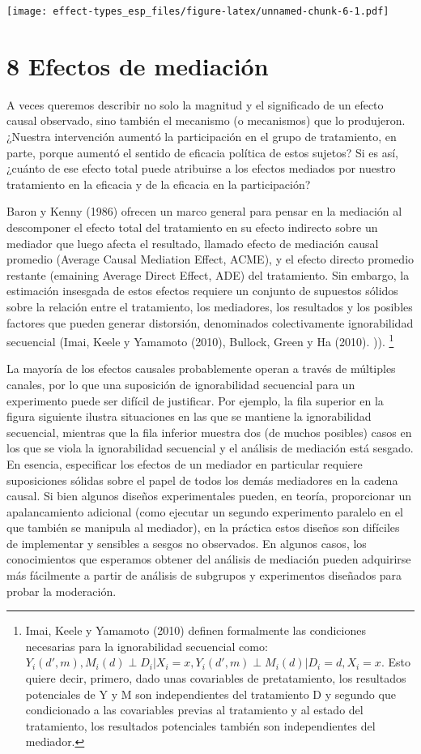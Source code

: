 \documentclass[
]{article}
\begin{document}
\texttt{[image: effect-types\_esp\_files/figure-latex/unnamed-chunk-6-1.pdf]}

\hypertarget{efectos-de-mediaciuxf3n}{%
\section{8 Efectos de mediación}\label{efectos-de-mediaciuxf3n}}

A veces queremos describir no solo la magnitud y el significado de un
efecto causal observado, sino también el mecanismo (o mecanismos) que lo
produjeron. ¿Nuestra intervención aumentó la participación en el grupo
de tratamiento, en parte, porque aumentó el sentido de eficacia política
de estos sujetos? Si es así, ¿cuánto de ese efecto total puede
atribuirse a los efectos mediados por nuestro tratamiento en la eficacia
y de la eficacia en la participación?

Baron y Kenny (1986) ofrecen un marco general para pensar en la
mediación al descomponer el efecto total del tratamiento en su efecto
indirecto sobre un mediador que luego afecta el resultado, llamado
efecto de mediación causal promedio (Average Causal Mediation Effect,
ACME), y el efecto directo promedio restante (emaining Average Direct
Effect, ADE) del tratamiento. Sin embargo, la estimación insesgada de
estos efectos requiere un conjunto de supuestos sólidos sobre la
relación entre el tratamiento, los mediadores, los resultados y los
posibles factores que pueden generar distorsión, denominados
colectivamente ignorabilidad secuencial (Imai, Keele y Yamamoto (2010),
Bullock, Green y Ha (2010). )). \footnote{Imai, Keele y Yamamoto (2010)
  definen formalmente las condiciones necesarias para la ignorabilidad
  secuencial como:
  \({Y_i(d',m),M_i(d)}\perp D_i|X_i=x, Y_i(d',m)\perp M_i(d)|D_i=d,X_i=x\).
  Esto quiere decir, primero, dado unas covariables de pretatamiento,
  los resultados potenciales de Y y M son independientes del tratamiento
  D y segundo que condicionado a las covariables previas al tratamiento
  y al estado del tratamiento, los resultados potenciales también son
  independientes del mediador.}

La mayoría de los efectos causales probablemente operan a través de
múltiples canales, por lo que una suposición de ignorabilidad secuencial
para un experimento puede ser difícil de justificar. Por ejemplo, la
fila superior en la figura siguiente ilustra situaciones en las que se
mantiene la ignorabilidad secuencial, mientras que la fila inferior
muestra dos (de muchos posibles) casos en los que se viola la
ignorabilidad secuencial y el análisis de mediación está sesgado. En
esencia, especificar los efectos de un mediador en particular requiere
suposiciones sólidas sobre el papel de todos los demás mediadores en la
cadena causal. Si bien algunos diseños experimentales pueden, en teoría,
proporcionar un apalancamiento adicional (como ejecutar un segundo
experimento paralelo en el que también se manipula al mediador), en la
práctica estos diseños son difíciles de implementar y sensibles a sesgos
no observados. En algunos casos, los conocimientos que esperamos obtener
del análisis de mediación pueden adquirirse más fácilmente a partir de
análisis de subgrupos y experimentos diseñados para probar la
moderación.
\end{document}
